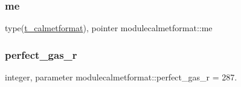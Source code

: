 \subsubsection{\texorpdfstring{me}{me}}
{\footnotesize\ttfamily type(\mbox{\hyperlink{structmodulecalmetformat_1_1t__calmetformat}{t\+\_\+calmetformat}}), pointer modulecalmetformat\+::me\hspace{0.3cm}{\ttfamily [private]}}

\mbox{\label{namespacemodulecalmetformat_a21173190f31cd07dd3e9d96b03a51822}} 
\subsubsection{\texorpdfstring{perfect\+\_\+gas\+\_\+r}{perfect\_gas\_r}}
{\footnotesize\ttfamily integer, parameter modulecalmetformat\+::perfect\+\_\+gas\+\_\+r = 287.\hspace{0.3cm}{\ttfamily [private]}}

